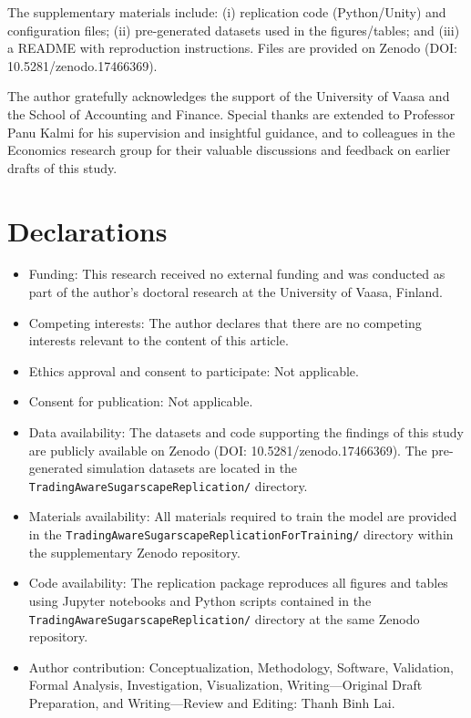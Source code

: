 \documentclass[pdflatex,sn-mathphys-num]{sn-jnl}%
\theoremstyle{thmstyleone}%
\theoremstyle{thmstyletwo}%
\theoremstyle{thmstylethree}%
\begin{document}
\backmatter


The supplementary materials include: (i) replication code (Python/Unity) and
configuration files; (ii) pre-generated datasets used in the figures/tables; and (iii) a README with reproduction instructions. Files are provided on Zenodo (DOI: 10.5281/zenodo.17466369).


The author gratefully acknowledges the support of the University of Vaasa and the School of Accounting and Finance. 
Special thanks are extended to Professor Panu Kalmi for his supervision and insightful guidance, and to colleagues in the Economics research group for their valuable discussions and feedback on earlier drafts of this study.

\section*{Declarations}

\begin{itemize}
\item Funding: This research received no external funding and was conducted as part of the author's doctoral research at the University of Vaasa, Finland.
\item Competing interests: The author declares that there are no competing interests relevant to the content of this article.
\item Ethics approval and consent to participate: Not applicable.
\item Consent for publication: Not applicable.
\item Data availability: The datasets and code supporting the findings of this study are publicly available on Zenodo (DOI: 10.5281/zenodo.17466369). 
  The pre-generated simulation datasets are located in the \texttt{TradingAwareSugarscapeReplication/} directory.
\item Materials availability:  All materials required to train the model are provided in the \texttt{TradingAwareSugarscapeReplicationForTraining/} directory within the supplementary Zenodo repository.
\item Code availability: The replication package reproduces all figures and tables using Jupyter notebooks and Python scripts contained in the \texttt{TradingAwareSugarscapeReplication/} directory at the same Zenodo repository.
\item Author contribution: Conceptualization, Methodology, Software, Validation, Formal Analysis, Investigation, Visualization, Writing---Original Draft Preparation, and Writing---Review and Editing: Thanh Binh Lai.
\end{itemize}


\end{document}
